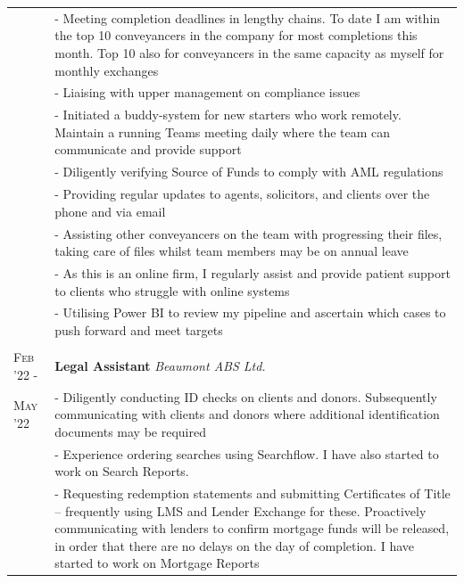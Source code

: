 \documentclass[a4paper,10pt]{extarticle} %
\begin{document}
{\begin{tabularx}{\linewidth}{ l | X }
& {- Meeting completion deadlines in lengthy chains. To date I am within the top 10 conveyancers in the company for most completions this month. Top 10 also for conveyancers in the same capacity as myself for monthly exchanges}\\

& {- Liaising with upper management on compliance issues}\\

& {- Initiated a buddy-system for new starters who work remotely. Maintain a running Teams meeting daily where the team can communicate and provide support}\\

& {- Diligently verifying Source of Funds to comply with AML regulations}\\


& {- Providing regular updates to agents, solicitors, and clients over the phone and via email}\\


& {- Assisting other conveyancers on the team with progressing their files, taking care of files whilst team members may be on annual leave}\\


& {- As this is an online firm, I regularly assist and provide patient support to clients who struggle with online systems}\\

& {- Utilising Power BI to review my pipeline and ascertain which cases to push forward and meet targets}\\
\multicolumn{1}{c}{} \\


\textsc{Feb '22 -} & \textbf{Legal Assistant} \hfill\textit{Beaumont ABS Ltd.}\\
\textsc{May '22}& {- Diligently conducting ID checks on clients and donors. Subsequently communicating with clients and donors where additional identification documents may be required}\\

& {- Experience ordering searches using Searchflow. I have also started to work on Search Reports.}\\

& {- Requesting redemption statements and submitting Certificates of Title – frequently using LMS and Lender Exchange for these. Proactively communicating with lenders to confirm mortgage funds will be released, in order that there are no delays on the day of completion. I have started to work on Mortgage Reports}\\


\end{tabularx}}
\end{document}
